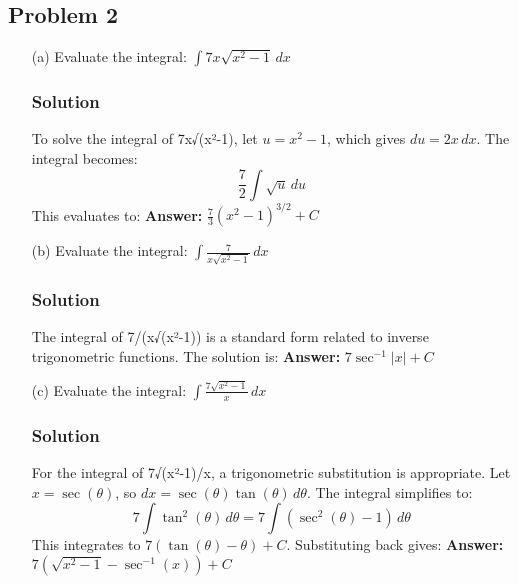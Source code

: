 \documentclass{article}
\begin{document}
\subsection{Problem 2}
\begin{enumerate}
    \item[(a)] Evaluate the integral: $ \int 7x\sqrt{x^2-1} \,dx $
    \subsubsection*{Solution}
    To solve the integral of 7x√(x²-1), let $ u = x^2-1 $, which gives $ du = 2x \,dx $. The integral becomes:
    \[ \frac{7}{2} \int \sqrt{u} \,du \]
    This evaluates to:
    \textbf{Answer:} $ \frac{7}{3}(x^2-1)^{3/2} + C $

    \item[(b)] Evaluate the integral: $ \int \frac{7}{x\sqrt{x^2-1}} \,dx $
    \subsubsection*{Solution}
    The integral of 7/(x√(x²-1)) is a standard form related to inverse trigonometric functions. The solution is:
    \textbf{Answer:} $ 7\sec^{-1}|x| + C $

    \item[(c)] Evaluate the integral: $ \int \frac{7\sqrt{x^2-1}}{x} \,dx $
    \subsubsection*{Solution}
    For the integral of 7√(x²-1)/x, a trigonometric substitution is appropriate. Let $ x = \sec(\theta) $, so $ dx = \sec(\theta)\tan(\theta) \,d\theta $. The integral simplifies to:
    \[ 7 \int \tan^2(\theta) \,d\theta = 7 \int (\sec^2(\theta) - 1) \,d\theta \]
    This integrates to $ 7(\tan(\theta) - \theta) + C $. Substituting back gives:
    \textbf{Answer:} $ 7(\sqrt{x^2-1} - \sec^{-1}(x)) + C $
\end{enumerate}


\end{document}

